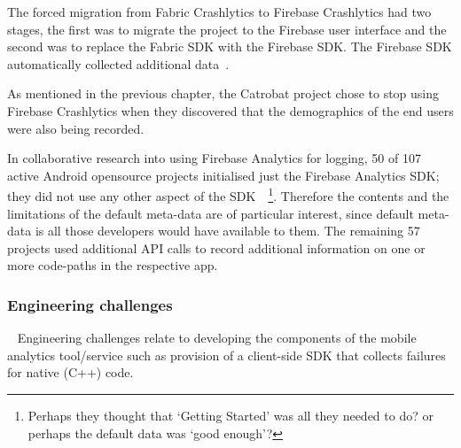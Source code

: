 The forced migration from Fabric Crashlytics to Firebase Crashlytics had two stages, the first was to migrate the project to the Firebase user interface and the second was to replace the Fabric SDK with the Firebase SDK. The Firebase SDK automatically collected additional data~\citep{firebase_help_GA4_2021_predefined_user_dimensions}.

As mentioned in the previous chapter, the Catrobat project chose to stop using Firebase Crashlytics when they discovered that the demographics of the end users were also being recorded. 

In collaborative research into using Firebase Analytics for logging, 50 of 107 active Android opensource projects initialised just the Firebase Analytics SDK; they did not use any other aspect of the SDK~\citep{harty2021_logging_practices_with_mobile_analytics}~\footnote{Perhaps they thought that `Getting Started' was all they needed to do? or perhaps the default data was `good enough'?}. Therefore the contents and the limitations of the default meta-data are of particular interest, since default meta-data is all those developers would have available to them. The remaining 57 projects used additional API calls to record additional information on one or more code-paths in the respective app.

\subsubsection{Engineering challenges}~\label{section-engineering-challenges}
Engineering challenges relate to developing the components of the mobile analytics tool/service such as provision of a client-side SDK that collects failures for native (C++) code.

